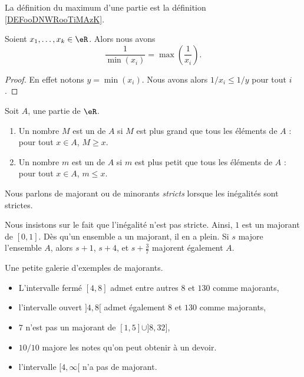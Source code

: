 La définition du maximum d'une partie est la définition \ref{DEFooDNWRooTiMAzK}.

\begin{proposition}
	Soient \( x_1,\ldots,x_k\in \eR\). Alors nous avons
	\begin{equation}
		\frac{1}{ \min(x_i)}=\max\left( \frac{1}{ x_i} \right).
	\end{equation}
\end{proposition}

\begin{proof}
	En effet notons \( y=\min(x_i)\). Nous avons alors \( 1/x_i\leq 1/y\) pour tout \( i\).
\end{proof}

\begin{definition}
	Soit \( A\), une partie de \( \eR\).
	\begin{enumerate}
		\item
		      Un nombre \( M\) est un  de \( A\) si \( M\) est plus grand que tous les éléments de \( A\) : pour tout \( x\in A\), \( M\geq x\).
		\item
		      Un nombre \( m\) est un  de \( A\) si \( m\) est plus petit que tous les éléments de \( A\) : pour tout \( x\in A\), \( m\leq x\).
	\end{enumerate}
	Nous parlons de majorant ou de minorants \emph{stricts} lorsque les inégalités sont strictes.
\end{definition}

Nous insistons sur le fait que l'inégalité n'est pas stricte. Ainsi, \( 1\) est un majorant de \( [0,1]\). Dès qu'un ensemble a un majorant, il en a plein. Si \( s\) majore l'ensemble \( A\), alors \( s+1\), \( s+4\), et \( s+\frac{ 3 }{ 7 }\) majorent également \( A\).

\begin{example}
	Une petite galerie d'exemples de majorants.
	\begin{itemize}
		\item L'intervalle fermé \( [4,8]\) admet entre autres \( 8\) et \( 130\) comme majorants,
		\item l'intervalle ouvert \( ]4,8[\) admet également \( 8\) et \( 130\) comme majorants,
		\item \( 7\) n'est pas un majorant de \( [1,5]\cup]8,32]\),
		\item \( 10/10\) majore les notes qu'on peut obtenir à un devoir.
		\item l'intervalle \( [4,\infty[\) n'a pas de majorant.
	\end{itemize}
\end{example}

